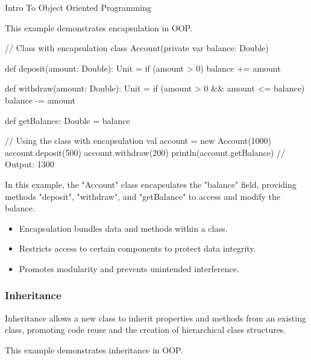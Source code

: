 \begin{notes}{Intro To Object Oriented Programming}
\begin{highlight}[Encapsulation]
        This example demonstrates encapsulation in OOP.
    
    \begin{code}[Scala]
    // Class with encapsulation
    class Account(private var balance: Double) {
        def deposit(amount: Double): Unit = {
            if (amount > 0) balance += amount
        }
    
        def withdraw(amount: Double): Unit = {
            if (amount > 0 && amount <= balance) balance -= amount
        }
    
        def getBalance: Double = balance
    }
    
    // Using the class with encapsulation
    val account = new Account(1000)
    account.deposit(500)
    account.withdraw(200)
    println(account.getBalance)  // Output: 1300
    \end{code}
    
        In this example, the "Account" class encapsulates the "balance" field, providing methods "deposit", "withdraw", and "getBalance" to access and modify the balance.
    
        \begin{itemize}
            \item Encapsulation bundles data and methods within a class.
            \item Restricts access to certain components to protect data integrity.
            \item Promotes modularity and prevents unintended interference.
        \end{itemize}
    
    \end{highlight}
    
    \subsubsection*{Inheritance}
    
    Inheritance allows a new class to inherit properties and methods from an existing class, promoting code reuse and the creation of hierarchical class structures.
    
    \begin{highlight}[Inheritance]
    
        This example demonstrates inheritance in OOP.
    
\end{highlight}
\end{notes}
